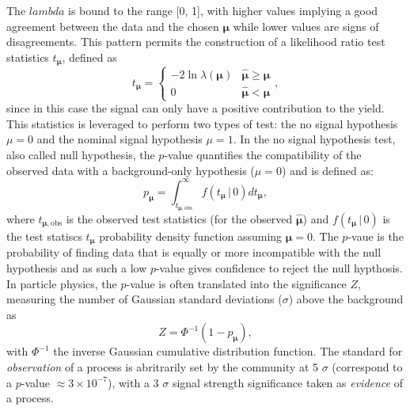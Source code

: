 The $lambda$ is bound to the range [0, 1], with higher values implying a good agreement between the data and the chosen $\boldsymbol{\mu}$ while lower values are signs of disagreements. This pattern permits the construction of a likelihood ratio test statistics $t_{\boldsymbol{\mu}}$, defined as \cite{asympForm}
\begin{equation}\label{eq-lik-ratio-test}
    t_{\boldsymbol{\mu}} =
      \begin{cases}
        -2 \ln \lambda(\boldsymbol{\mu}) & \hat{\boldsymbol{\mu}} \geq \boldsymbol{\mu} \\
        0 & \hat{\boldsymbol{\mu}} < \boldsymbol{\mu}
      \end{cases},
\end{equation}
since in this case the signal can only have a positive contribution to the yield. This statistics is leveraged to perform two types of test: the no signal hypothesis $\mu = 0$ and the nominal signal hypothesis $\mu = 1$. In the no signal hypothesis test, also called null hypothesis, the $p$-value quantifies the compatibility of the observed data with a background-only hypothesis ($\mu = 0$) and is defined as:
\begin{equation}
    p_{\boldsymbol{\mu}}=\int_{t_{\boldsymbol{\mu},\mathrm{obs}}}^{\infty} f(t_{\boldsymbol{\mu}} \,| \, 0) dt_{\boldsymbol{\mu}},
\end{equation}
where $t_{\boldsymbol{\mu},\mathrm{obs}}$ is the observed test statistics (for the observed $\hat{\boldsymbol{\mu}}$) and $f(t_{\boldsymbol{\mu}} \,| \,0)$ is the test statiscs $t_{\boldsymbol{\mu}}$ probability density function assuming $\boldsymbol{\mu} = 0$. The $p$-vaue is the probability of finding data that is equally or more incompatible with the null hypothesis and as such a low $p$-value gives confidence to reject the null hypthosis. In particle physics, the $p$-value is often translated into the significance $Z$, measuring the number of Gaussian standard deviations ($\sigma$) above the background as
\begin{equation}
    Z = \Phi^{-1}(1-p_{\boldsymbol{\mu}}),
\end{equation}
with $\Phi^{-1}$ the inverse Gaussian cumulative distribution function. The standard for \textit{observation} of a process is abritrarily set by the community at 5 $\sigma$ (correspond to a $p$-value $\approx 3 \times 10^{-7}$), with a 3 $\sigma$ signal strength significance taken as \textit{evidence} of a process. \\


